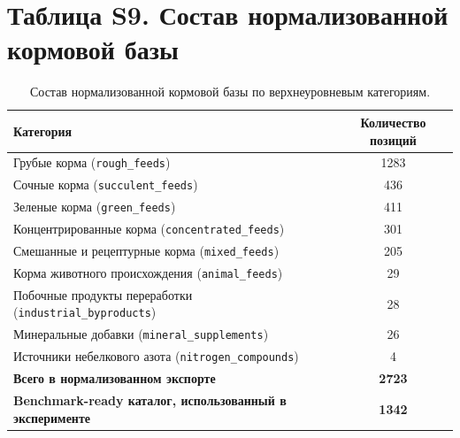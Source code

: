 \documentclass[11pt]{article}
\begin{document}
\section*{Таблица S9. Состав нормализованной кормовой базы}
\begin{table}[H]
\centering
\caption{Состав нормализованной кормовой базы по верхнеуровневым категориям.}\label{tab:s9_db}
\begin{tabular}{lc}
\toprule
\textbf{Категория} & \textbf{Количество позиций} \\
\midrule
Грубые корма (\texttt{rough\_feeds}) & 1283 \\
Сочные корма (\texttt{succulent\_feeds}) & 436 \\
Зеленые корма (\texttt{green\_feeds}) & 411 \\
Концентрированные корма (\texttt{concentrated\_feeds}) & 301 \\
Смешанные и рецептурные корма (\texttt{mixed\_feeds}) & 205 \\
Корма животного происхождения (\texttt{animal\_feeds}) & 29 \\
Побочные продукты переработки (\texttt{industrial\_byproducts}) & 28 \\
Минеральные добавки (\texttt{mineral\_supplements}) & 26 \\
Источники небелкового азота (\texttt{nitrogen\_compounds}) & 4 \\
\midrule
\textbf{Всего в нормализованном экспорте} & \textbf{2723} \\
\textbf{Benchmark-ready каталог, использованный в эксперименте} & \textbf{1342} \\
\bottomrule
\end{tabular}
\end{table}
\end{document}
